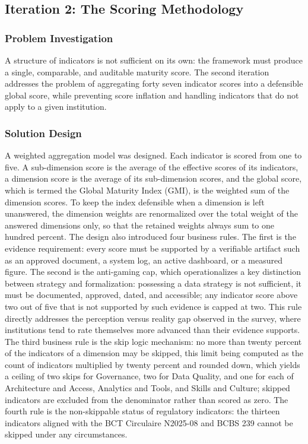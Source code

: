 \subsection{Iteration 2: The Scoring Methodology}

\subsubsection{Problem Investigation}

A structure of indicators is not sufficient on its own: the framework must produce a single, comparable, and auditable maturity score. The second iteration addresses the problem of aggregating forty seven indicator scores into a defensible global score, while preventing score inflation and handling indicators that do not apply to a given institution.

\subsubsection{Solution Design}

A weighted aggregation model was designed. Each indicator is scored from one to five. A sub-dimension score is the average of the effective scores of its indicators, a dimension score is the average of its sub-dimension scores, and the global score, which is termed the Global Maturity Index (GMI), is the weighted sum of the dimension scores. To keep the index defensible when a dimension is left unanswered, the dimension weights are renormalized over the total weight of the answered dimensions only, so that the retained weights always sum to one hundred percent. The design also introduced four business rules. The first is the evidence requirement: every score must be supported by a verifiable artifact such as an approved document, a system log, an active dashboard, or a measured figure. The second is the anti-gaming cap, which operationalizes a key distinction between strategy and formalization: possessing a data strategy is not sufficient, it must be documented, approved, dated, and accessible; any indicator score above two out of five that is not supported by such evidence is capped at two. This rule directly addresses the perception versus reality gap observed in the survey, where institutions tend to rate themselves more advanced than their evidence supports. The third business rule is the skip logic mechanism: no more than twenty percent of the indicators of a dimension may be skipped, this limit being computed as the count of indicators multiplied by twenty percent and rounded down, which yields a ceiling of two skips for Governance, two for Data Quality, and one for each of Architecture and Access, Analytics and Tools, and Skills and Culture; skipped indicators are excluded from the denominator rather than scored as zero. The fourth rule is the non-skippable status of regulatory indicators: the thirteen indicators aligned with the BCT Circulaire N\textdegree{}2025-08 and BCBS 239 cannot be skipped under any circumstances.

